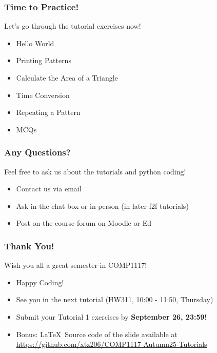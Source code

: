 \documentclass{beamer}
\begin{document}
\begin{frame}
    \frametitle{Time to Practice!}

    Let's go through the tutorial exercises now!
    \begin{itemize}
        \item Hello World
        \item Printing Patterns
        \item Calculate the Area of a Triangle
        \item Time Conversion
        \item Repeating a Pattern
        \item MCQs
    \end{itemize}
\end{frame}

\begin{frame}
    \frametitle{Any Questions?}

    Feel free to ask us about the tutorials and python coding!

    \begin{itemize}
        \item Contact us via email
        \item Ask in the chat box or in-person (in later f2f tutorials)
        \item Post on the course forum on Moodle or Ed
    \end{itemize}
\end{frame}

\begin{frame}
    \frametitle{Thank You!}

    Wish you all a great semester in COMP1117!

    \begin{itemize}
        \item Happy Coding!
        \item See you in the next tutorial (HW311, 10:00 - 11:50, Thursday)
        \item Submit your Tutorial 1 exercises by \textbf{September 26, 23:59}!
        \item Bonus: \LaTeX \  Source code of the slide available at
              \href{https://github.com/xtz206/COMP1117-Autumn25-Tutorials}{https://github.com/xtz206/COMP1117-Autumn25-Tutorials}
    \end{itemize}
\end{frame}
\end{document}
